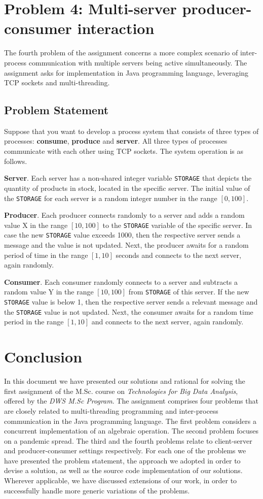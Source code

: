 \documentclass[acmlarge]{acmart}
\newcommand{\storage}{{\small \texttt{STORAGE}} }
\begin{document}
\section{Problem 4: Multi-server producer-consumer interaction}
\label{section:problem4}
The fourth problem of the assignment concerns a more complex scenario of inter-process communication with multiple servers being active simultaneously. The assignment asks for implementation in Java programming language, leveraging TCP sockets and multi-threading.
\subsection{Problem Statement}
Suppose that you want to develop a process system that consists of three types of processes: \textbf{consume}, \textbf{produce} and \textbf{server}. All three types of processes communicate with each other using TCP sockets. The system operation is as follows.

\textbf{Server}. Each server has a non-shared integer variable \storage that depicts the quantity of products in stock, located in the specific server. The initial value of the \storage for each server is a random integer number in the range $[0, 100]$.

\textbf{Producer}. Each producer connects randomly to a server and adds a random value X in the range $[10, 100]$ to the \storage variable of the specific server. In case the new \storage value exceeds 1000, then the respective server sends a message and the value is not updated. Next, the producer awaits for a random period of time in the range $[1, 10]$ seconds and connects to the next server, again randomly.

\textbf{Consumer}. Each consumer randomly connects to a server and subtracts a random value Y in the range $[10, 100]$ from \storage of this server. If the new \storage value is below 1, then the respective server sends a relevant message and the \storage value is not updated. Next, the consumer awaits for a random time period in the range $[1, 10]$ and connects to the next server, again randomly.


\section{Conclusion}
\label{section:conclusion}
In this document we have presented our solutions and rational for solving the first assignment of the M.Sc. course on \emph{Technologies for Big Data Analysis}, offered by the \emph{DWS M.Sc Program}. The assignment comprises four problems that are closely related to multi-threading programming and inter-process communication in the Java programming language. The first problem considers a concurrent implementation of an algebraic operation. The second problem focuses on a pandemic spread. The third and the fourth problems relate to client-server and producer-consumer settings respectively. For each one of the problems we have presented the problem statement, the approach we adopted in order to devise a solution, as well as the source code implementation of our solutions. Wherever applicable, we have discussed extensions of our work, in order to successfully handle more generic variations of the problems.
\end{document}
